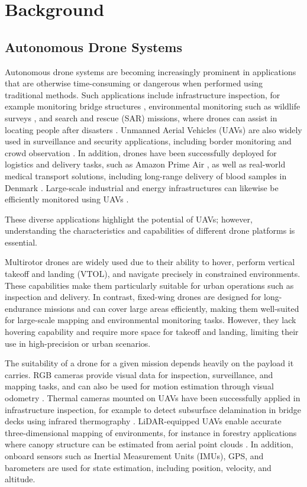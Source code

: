 \chapter{Background}

\section{Autonomous Drone Systems}

Autonomous drone systems are becoming increasingly prominent in applications that are otherwise time-consuming or dangerous when performed using traditional methods.
Such applications include infrastructure inspection, for example monitoring bridge structures \cite{ellenberg2016bridge}, environmental monitoring such
as wildlife surveys \cite{anderson2013uav}, and search and rescue (SAR) missions, where drones can assist in locating people after disasters \cite{erdelj2016uav}.
Unmanned Aerial Vehicles (UAVs) are also widely used in surveillance and security applications, including border monitoring and crowd observation \cite{zhou2023uav}.
In addition, drones have been successfully deployed for logistics and delivery tasks, such as Amazon Prime Air \cite{amazon_prime_air}, as well as real-world medical
transport solutions, including long-range delivery of blood samples in Denmark \cite{investindk2022health_drone}.
Large-scale industrial and energy infrastructures can likewise be efficiently monitored using UAVs \cite{nooralishahi2021drone}.

These diverse applications highlight the potential of UAVs; however, understanding the characteristics and capabilities of different drone platforms is essential.

Multirotor drones are widely used due to their ability to hover, perform vertical takeoff and landing (VTOL), and navigate precisely in constrained environments.
These capabilities make them particularly suitable for urban operations such as inspection and delivery.
In contrast, fixed-wing drones are designed for long-endurance missions and can cover large areas efficiently, making them well-suited for large-scale mapping and
environmental monitoring tasks. However, they lack hovering capability and require more space for takeoff and landing, limiting their use in high-precision or urban scenarios.

The suitability of a drone for a given mission depends heavily on the payload it carries.
RGB cameras provide visual data for inspection, surveillance, and mapping tasks, and can also be used for motion estimation through visual odometry \cite{rostum2023visual}.
Thermal cameras mounted on UAVs have been successfully applied in infrastructure inspection, for example to detect subsurface delamination in bridge decks using infrared 
thermography \cite{ellenberg2016bridge}.
LiDAR-equipped UAVs enable accurate three-dimensional mapping of environments, for instance in forestry applications where canopy structure can be estimated from aerial point 
clouds \cite{wallace2016assessment}.
In addition, onboard sensors such as Inertial Measurement Units (IMUs), GPS, and barometers are used for state estimation, including position, velocity, and altitude.

